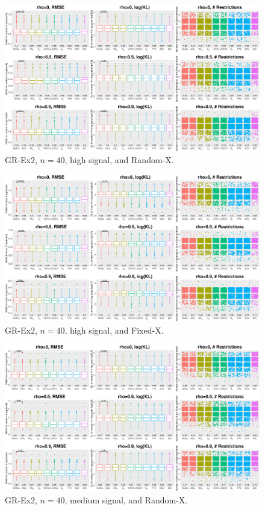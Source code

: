 \clearpage
\begin{figure}[!ht]
\centering
\includegraphics[width=\textwidth]{figures/supplement/randomx_GR-Ex2_n40_hsnr.eps}
\caption{GR-Ex2, $n=40$, high signal, and Random-X.}
\end{figure}
\begin{figure}[!ht]
\centering
\includegraphics[width=\textwidth]{figures/supplement/fixedx_GR-Ex2_n40_hsnr.eps}
\caption{GR-Ex2, $n=40$, high signal, and Fixed-X.}
\end{figure}
\clearpage
\begin{figure}[!ht]
\centering
\includegraphics[width=\textwidth]{figures/supplement/randomx_GR-Ex2_n40_msnr.eps}
\caption{GR-Ex2, $n=40$, medium signal, and Random-X.}
\end{figure}
